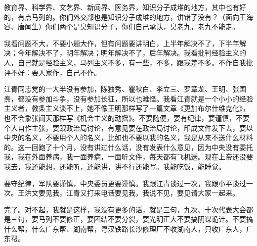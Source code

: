 教育界、科学界、文艺界、新闻界、医务界，知识分子成堆的地方，其中也有好的，有点马列的。你们外交部也是知识分子成堆的地方，讲错了没有？（面向王海容、唐闻生）你们两个是臭知识分子，你们自己承认，臭老九，老九不能走。

我看问题不大，不要小题大作，但有问题要讲明白，上半年解决不了，下半年解决；今年解决不了，明年解决；明年解决不了，后年解决。我看批判经验主义的人，自己就是经验主义，马列主义不多，有一些，不多，跟我差不多。不作自我批评不好：要人家作，自己不作。

江青同志党的一大半没有参加，陈独秀、瞿秋白、李立三、罗章龙、王明、张国焘，都没有参加斗争，没有参加长征，所以也难怪。我看江青就是一个小小的经验主义者，教条主义谈不上，她不像王明那样写了一篇文章《更加布尔什维克化》，也不会象张闻天那样写《机会主义的动摇》。不要随便，要有纪律，要谨慎，不要个人自作主张，要跟政治局讨论，有意见要在政治局讨论，印成文件发下去，要以中央的名义，不要用个人的名义，比如也不要以我的名义，我是从来不送什么材料的。这一回跑了十个月，没有讲过什么话，没有发表什么意见，因为中央没有委托我，我在外面养病，我一面养病，一面听文件，每天都有飞机送。现在上帝还没要我去，我还能想，还能听，还能讲，讲不行还能写。我能吃饭，能睡觉。

要守纪律，军队要谨慎，中央委员更要谨慎。我跟江青谈过一次，我跟小平谈过一次。王洪文要见我，江青又打来电话要见我，我说不见，要见请大家一起来。

完了。对不起，我就是这样，我没有更多的话，就是三句，九次、十次代表大会都是三句，要马列不要修正，要团结不要分裂，要光明正大不要搞阴谋诡计。不要搞什么帮，什么广东帮、湖南帮，粤汉铁路长沙修理厂不收湖南人，只收广东人，广东帮。

